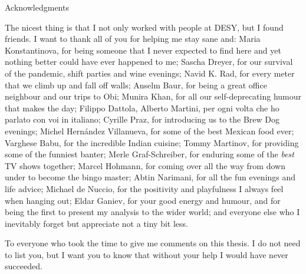 \begin{abstractpage}{Acknowledgments}
   
    The nicest thing is that I not only worked with people at DESY, but I found friends.
    I want to thank all of you for helping me stay sane and:
    Maria Konstantinova, for being someone that I never expected to find here and yet nothing better could have ever happened to me;
    Sascha Dreyer, for our survival of the pandemic, shift parties and wine evenings;
    Navid K. Rad, for every meter that we climb up and fall off walls;
    Anselm Baur, for being a great office neighbour and our trips to Obi;
    Munira Khan, for all our self-deprecating humour that makes the day;
    Filippo Dattola, Alberto Martini, per ogni volta che ho parlato con voi in italiano;
    Cyrille Praz, for introducing us to the Brew Dog evenings;
    Michel Hern\'andez Villanueva, for some of the best Mexican food ever;
    Varghese Babu, for the incredible Indian cuisine;
    Tommy Martinov, for providing some of the funniest banter;
    Merle Graf-Schreiber, for enduring some of the \textit{best} TV shows together;
    Marcel Hohmann, for coming over all the way from down under to become the bingo master;
    Abtin Narimani, for all the fun evenings and life advice;
    Michael de Nuccio, for the positivity and playfulness I always feel when hanging out;
    Eldar Ganiev, for your good energy and humour, and for being the first to present my analysis to the wider world;
    and everyone else who I inevitably forget but appreciate not a tiny bit less.

    To everyone who took the time to give me comments on this thesis.
    I do not need to list you, but I want you to know that without your help I would have never succeeded.


\end{abstractpage}
